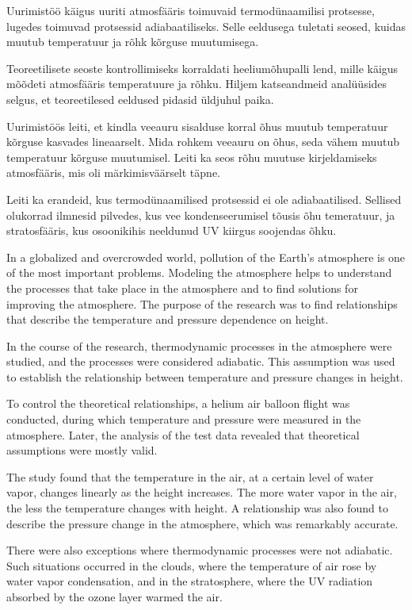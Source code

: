 \documentclass{trkut}%
\begin{document}
Uurimistöö käigus uuriti atmosfääris toimuvaid termodünaamilisi protsesse, lugedes toimuvad protsessid adiabaatiliseks. Selle eeldusega tuletati seosed, kuidas muutub temperatuur ja rõhk kõrguse muutumisega.

Teoreetilisete seoste kontrollimiseks korraldati heeliumõhupalli lend, mille käigus mõõdeti atmosfääris temperatuure ja rõhku. Hiljem katseandmeid analüüsides selgus, et teoreetilesed eeldused pidasid üldjuhul paika.

Uurimistöös leiti, et kindla veeauru sisalduse korral õhus muutub temperatuur kõrguse kasvades lineaarselt. Mida rohkem veeauru on õhus, seda vähem muutub temperatuur kõrguse muutumisel. Leiti ka seos rõhu muutuse kirjeldamiseks atmosfääris, mis oli märkimisväärselt täpne.

Leiti ka erandeid, kus termodünaamilised protsessid ei ole adiabaatilised. Sellised olukorrad ilmnesid pilvedes, kus vee kondenseerumisel tõusis õhu temeratuur, ja stratosfääris, kus osoonikihis neeldunud UV kiirgus soojendas õhku.




In a globalized and overcrowded world, pollution of the Earth's atmosphere is one of the most important problems. Modeling the atmosphere helps to understand the processes that take place in the atmosphere and to find solutions for improving the atmosphere. The purpose of the research was to find relationships that describe the temperature and pressure dependence on height.

In the course of the research, thermodynamic processes in the atmosphere were studied, and the processes were considered adiabatic. This assumption was used to establish the relationship between temperature and pressure changes in height.

To control the theoretical relationships, a helium air balloon flight was conducted, during which temperature and pressure were measured in the atmosphere. Later, the analysis of the test data revealed that theoretical assumptions were mostly valid.

The study found that the temperature in the air, at a certain level of water vapor, changes linearly as the height increases. The more water vapor in the air, the less the temperature changes with height. A relationship was also found to describe the pressure change in the atmosphere, which was remarkably accurate.

There were also exceptions where thermodynamic processes were not adiabatic. Such situations occurred in the clouds, where the temperature of air rose by water vapor condensation, and in the stratosphere, where the UV radiation absorbed by the ozone layer warmed the air.
\end{document}
